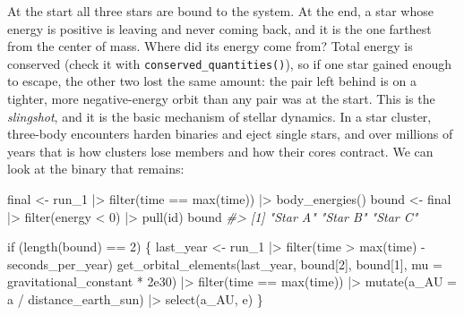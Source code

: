 \documentclass[
  10.5pt,
  letterpaper,
]{scrbook}
\newenvironment{Shaded}{\begin{snugshade}}{\end{snugshade}}
\newcommand{\AttributeTok}[1]{\textcolor[rgb]{0.00,0.00,0.00}{#1}}
\newcommand{\CommentTok}[1]{\textcolor[rgb]{0.00,0.00,0.00}{\textit{#1}}}
\newcommand{\ControlFlowTok}[1]{\textcolor[rgb]{0.00,0.00,0.00}{#1}}
\newcommand{\DecValTok}[1]{\textcolor[rgb]{0.00,0.00,0.00}{#1}}
\newcommand{\FloatTok}[1]{\textcolor[rgb]{0.00,0.00,0.00}{#1}}
\newcommand{\FunctionTok}[1]{\textcolor[rgb]{0.00,0.00,0.00}{#1}}
\newcommand{\NormalTok}[1]{\textcolor[rgb]{0.00,0.00,0.00}{#1}}
\newcommand{\OtherTok}[1]{\textcolor[rgb]{0.00,0.00,0.00}{#1}}
\newcommand{\SpecialCharTok}[1]{\textcolor[rgb]{0.00,0.00,0.00}{#1}}
\theoremstyle{definition}
\theoremstyle{plain}
\theoremstyle{remark}
\begin{document}
At the start all three stars are bound to the system. At the end, a star
whose energy is positive is leaving and never coming back, and it is the
one farthest from the center of mass. Where did its energy come from?
Total energy is conserved (check it with
\texttt{conserved\_quantities()}), so if one star gained enough to
escape, the other two lost the same amount: the pair left behind is on a
tighter, more negative-energy orbit than any pair was at the start. This
is the \emph{slingshot}, and it is the basic mechanism of stellar
dynamics. In a star cluster, three-body encounters harden binaries and
eject single stars, and over millions of years that is how clusters lose
members and how their cores contract. We can look at the binary that
remains:

\begin{Shaded}
\begin{Highlighting}[]
\NormalTok{final }\OtherTok{\textless{}{-}}\NormalTok{ run\_1 }\SpecialCharTok{|\textgreater{}} \FunctionTok{filter}\NormalTok{(time }\SpecialCharTok{==} \FunctionTok{max}\NormalTok{(time)) }\SpecialCharTok{|\textgreater{}} \FunctionTok{body\_energies}\NormalTok{()}
\NormalTok{bound }\OtherTok{\textless{}{-}}\NormalTok{ final }\SpecialCharTok{|\textgreater{}} \FunctionTok{filter}\NormalTok{(energy }\SpecialCharTok{\textless{}} \DecValTok{0}\NormalTok{) }\SpecialCharTok{|\textgreater{}} \FunctionTok{pull}\NormalTok{(id)}
\NormalTok{bound}
\CommentTok{\#\textgreater{} [1] "Star A" "Star B" "Star C"}
\end{Highlighting}
\end{Shaded}

\begin{Shaded}
\begin{Highlighting}[]
\ControlFlowTok{if}\NormalTok{ (}\FunctionTok{length}\NormalTok{(bound) }\SpecialCharTok{==} \DecValTok{2}\NormalTok{) \{}
\NormalTok{  last\_year }\OtherTok{\textless{}{-}}\NormalTok{ run\_1 }\SpecialCharTok{|\textgreater{}} \FunctionTok{filter}\NormalTok{(time }\SpecialCharTok{\textgreater{}} \FunctionTok{max}\NormalTok{(time) }\SpecialCharTok{{-}}\NormalTok{ seconds\_per\_year)}
  \FunctionTok{get\_orbital\_elements}\NormalTok{(last\_year, bound[}\DecValTok{2}\NormalTok{], bound[}\DecValTok{1}\NormalTok{],}
                       \AttributeTok{mu =}\NormalTok{ gravitational\_constant }\SpecialCharTok{*} \FloatTok{2e30}\NormalTok{) }\SpecialCharTok{|\textgreater{}}
    \FunctionTok{filter}\NormalTok{(time }\SpecialCharTok{==} \FunctionTok{max}\NormalTok{(time)) }\SpecialCharTok{|\textgreater{}}
    \FunctionTok{mutate}\NormalTok{(}\AttributeTok{a\_AU =}\NormalTok{ a }\SpecialCharTok{/}\NormalTok{ distance\_earth\_sun) }\SpecialCharTok{|\textgreater{}}
    \FunctionTok{select}\NormalTok{(a\_AU, e)}
\NormalTok{\}}
\end{Highlighting}
\end{Shaded}
\end{document}
